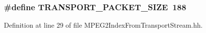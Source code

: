 \subsubsection[{T\+R\+A\+N\+S\+P\+O\+R\+T\+\_\+\+P\+A\+C\+K\+E\+T\+\_\+\+S\+I\+Z\+E}]{\setlength{\rightskip}{0pt plus 5cm}\#define T\+R\+A\+N\+S\+P\+O\+R\+T\+\_\+\+P\+A\+C\+K\+E\+T\+\_\+\+S\+I\+Z\+E~188}\label{MPEG2IndexFromTransportStream_8hh_a891f58234cacae3f083264f5b0aff841}


Definition at line 29 of file M\+P\+E\+G2\+Index\+From\+Transport\+Stream.\+hh.

